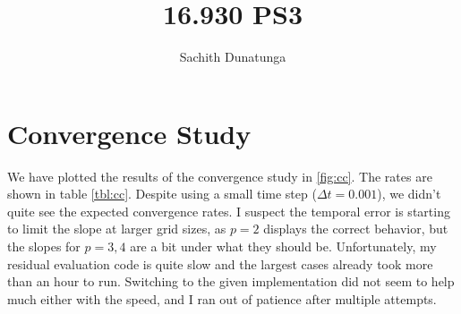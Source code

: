 \documentclass{article}
\begin{document}
\author{Sachith Dunatunga}
\title{16.930 PS3}
\maketitle

\section{Convergence Study}
We have plotted the results of the convergence study in \ref{fig:cc}.
The rates are shown in table \ref{tbl:cc}.
Despite using a small time step ($\Delta t = 0.001$), we didn't quite see the expected convergence rates.
I suspect the temporal error is starting to limit the slope at larger grid sizes, as $p=2$ displays the correct behavior, but the slopes for $p = 3,4$ are a bit under what they should be.
Unfortunately, my residual evaluation code is quite slow and the largest cases already took more than an hour to run.
Switching to the given implementation did not seem to help much either with the speed, and I ran out of patience after multiple attempts.
\end{document}

